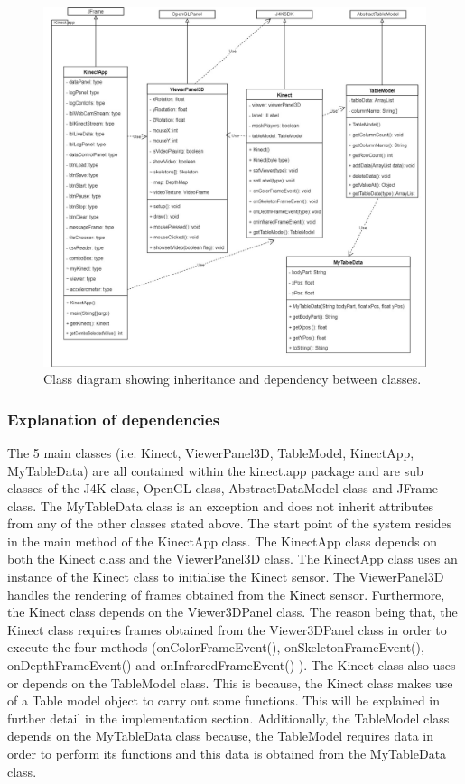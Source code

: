 \documentclass[a4paper, 12pt]{article}
\begin{document}
\begin{figure}[!htb]
	\begin{center}
  \includegraphics[scale=0.4]{classdiagram.jpg}
  	\caption{Class diagram showing inheritance and dependency between classes.}
  \end{center} 
  \label{fig: classDiagram} 
\end{figure}



\subsubsection{Explanation of dependencies}
The 5 main classes (i.e. Kinect, ViewerPanel3D, TableModel, KinectApp, MyTableData) are all contained within the kinect.app package and are sub classes of the J4K class, OpenGL class, AbstractDataModel class and JFrame class. The MyTableData class is an exception and does not inherit attributes from any of the other classes stated above. The start point of the system resides in the main method of the KinectApp class. The KinectApp class depends on both the Kinect class and the ViewerPanel3D class. The KinectApp class uses an instance of the Kinect class to initialise the Kinect sensor. The ViewerPanel3D handles the rendering of frames obtained from the Kinect sensor. Furthermore, the Kinect class depends on the Viewer3DPanel class. The reason being that, the Kinect class requires frames obtained from the Viewer3DPanel class in order to execute the four methods (onColorFrameEvent(), onSkeletonFrameEvent(), onDepthFrameEvent() and onInfraredFrameEvent() ). The Kinect class also uses or depends on the TableModel class. This is because, the Kinect class makes use of a Table model object to carry out some functions. This will be explained in further detail in the implementation section. Additionally, the TableModel class depends on the MyTableData class because, the TableModel requires data in order to perform its functions and this data is obtained from the MyTableData class.
\end{document}
